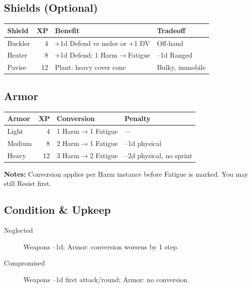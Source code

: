\documentclass[11pt,twoside,openany]{book}
\begin{document}
\subsection*{Shields (Optional)}

\begin{center}
\begin{tabular}{|l|r|l|l|}
\hline
\textbf{Shield} & \textbf{XP} & \textbf{Benefit} & \textbf{Tradeoff} \\
\hline
Buckler & 4 & +1d Defend vs melee or +1 DV & Off-hand \\
Heater & 8 & +1d Defend; 1 Harm$\rightarrow$Fatigue & --1d Ranged \\
Pavise & 12 & Plant: heavy cover cone & Bulky, immobile \\
\hline
\end{tabular}
\end{center}

\subsection*{Armor}

\begin{center}
\begin{tabular}{|l|r|l|l|}
\hline
\textbf{Armor} & \textbf{XP} & \textbf{Conversion} & \textbf{Penalty} \\
\hline
Light & 4 & 1 Harm$\rightarrow$1 Fatigue & --- \\
Medium & 8 & 2 Harm$\rightarrow$1 Fatigue & --1d physical \\
Heavy & 12 & 3 Harm$\rightarrow$2 Fatigue & --2d physical, no sprint \\
\hline
\end{tabular}
\end{center}

\textbf{Notes:} Conversion applies per Harm instance before Fatigue is marked. You may still Resist first.

\subsection*{Condition \& Upkeep}

\begin{description}
\item[Neglected] Weapons --1d; Armor: conversion worsens by 1 step.
\item[Compromised] Weapons --1d first attack/round; Armor: no conversion.
\end{description}
\end{document}
